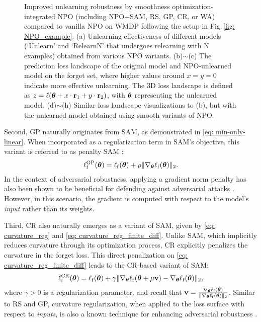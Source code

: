 \begin{figure*}[htb]
\caption{\small{Improved unlearning robustness by smoothness optimization-integrated NPO (including NPO+SAM, RS, GP, CR, or WA) compared to vanilla NPO on WMDP following the setup in Fig.\,\ref{fig: NPO_example}. 
(a) Unlearning effectiveness of different models (`Unlearn' and `Relearn$\mathrm{N}$' that undergoes relearning with $\mathrm{N}$ examples) obtained from various NPO variants. 
(b)$\sim$(c) The prediction loss landscape of the original model and NPO-unlearned model on the forget set, where higher values around $x = y = 0$ indicate more effective unlearning. 
 The 3D loss landscape is defined as $z = \ell({\boldsymbol{\theta}} + x \cdot \mathbf{r}_1 + y \cdot \mathbf{r}_2)$, with ${\boldsymbol{\theta}}$ representing the unlearned model. 
 (d)$\sim$(h) Similar loss landscape visualizations to (b), but with the unlearned model obtained using smooth variants of NPO. 
}}
\label{fig: loss_lanscape}
\end{figure*}


Second, GP naturally originates from SAM, as demonstrated in \eqref{eq: min-only-linear}. When incorporated as a regularization term in SAM's objective, this variant is referred to as {penalty SAM} \citep{dauphin2024neglected}:
\begin{align}
    \ell^{\mathrm{GP}}_{\mathrm{f}} ({\boldsymbol{\theta}}) = \ell_{\mathrm{f}} ({\boldsymbol{\theta}}) + \rho \| \nabla_{{\boldsymbol{\theta}}} \ell_{\mathrm{f}} ({\boldsymbol{\theta}} ) \|_2.
    \label{eq: SAM_GP}
\end{align}
In the context of adversarial robustness, applying a gradient norm penalty has also been shown to be beneficial for defending against adversarial attacks \citep{finlay2021scaleable}. However, in this scenario, the gradient is computed with respect to the model's \textit{input} rather than its weights.


Third, CR also naturally emerges as a variant of SAM, given by \eqref{eq: curvature_reg} and \eqref{eq: curvature_reg_finite_diff}. Unlike SAM, which implicitly reduces curvature through its optimization process, CR explicitly penalizes the curvature in the forget loss. This direct penalization on \eqref{eq: curvature_reg_finite_diff} leads to the CR-based variant of SAM:
\begin{align}
\ell^{\mathrm{CR}}_{\mathrm{f}} ({\boldsymbol{\theta}}) = \ell_{\mathrm{f}} ({\boldsymbol{\theta}}) + \gamma \| \nabla_{{\boldsymbol{\theta}}} \ell_{\mathrm{f}} ({\boldsymbol{\theta}} + \mu \mathbf v ) -\nabla_{{\boldsymbol{\theta}}} \ell_{\mathrm{f}} ({\boldsymbol{\theta}} )  \|_2,
        \label{eq: SAM_CR}
\end{align}
where $\gamma > 0$ is a regularization parameter, and recall that $\mathbf v = \frac{   \nabla_{{\boldsymbol{\theta}}} \ell_{\mathrm{f}}  ({\boldsymbol{\theta}} )}{\| \nabla_{{\boldsymbol{\theta}}} \ell_{\mathrm{f}} ({\boldsymbol{\theta}} ) \|_2}$. Similar to RS and GP, curvature regularization, when applied to the loss surface with respect to \textit{inputs}, is also a known technique for enhancing adversarial robustness  \citep{moosavi2019robustness}.




